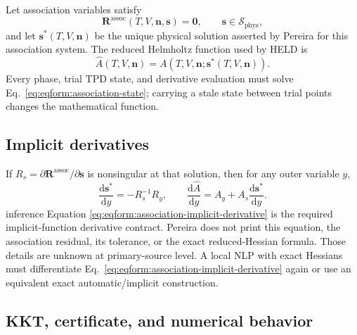 \documentclass[11pt]{article}
\newcommand{\Evidence}[1]{\textsf{#1}}
\newcommand{\dd}{\mathrm{d}}
\begin{document}
Let association variables satisfy
\begin{equation}
 \boldsymbol R^{\mathrm{assoc}}
 (T,V,\boldsymbol n,\boldsymbol s)=\boldsymbol0,\qquad
 \boldsymbol s\in\mathcal S_{\mathrm{phys}},
\label{eq:eqform:association-state}
\end{equation}
and let \(\boldsymbol s^*(T,V,\boldsymbol n)\) be the unique physical solution
asserted by Pereira for this association system.
The reduced Helmholtz function used by HELD is
\begin{equation}
 \widehat A(T,V,\boldsymbol n)=
 A(T,V,\boldsymbol n;\boldsymbol s^*(T,V,\boldsymbol n)).
\label{eq:eqform:association-reduced-helmholtz}
\end{equation}
Every phase, trial TPD state, and derivative evaluation must solve
Eq.~\eqref{eq:eqform:association-state}; carrying a stale state between trial
points changes the mathematical function.

\subsection{Implicit derivatives}

If \(R_s=\partial\boldsymbol R^{\mathrm{assoc}}/\partial\boldsymbol s\)
is nonsingular at that solution, then for any outer variable \(y\),
\begin{equation}
 \frac{\dd\boldsymbol s^*}{\dd y}
 =-R_s^{-1}R_y,\qquad
 \frac{\dd\widehat A}{\dd y}
 =A_y+A_s\frac{\dd\boldsymbol s^*}{\dd y}.
\label{eq:eqform:association-implicit-derivative}
\end{equation}
\Evidence{inference} Equation
\eqref{eq:eqform:association-implicit-derivative} is the required
implicit-function derivative contract. Pereira does not print this equation,
the association residual, its tolerance, or the exact reduced-Hessian formula.
Those details are \Evidence{unknown} at primary-source level. A local NLP with
exact Hessians must differentiate
Eq.~\eqref{eq:eqform:association-implicit-derivative} again or use an
equivalent exact automatic/implicit construction.

\subsection{KKT, certificate, and numerical behavior}
\end{document}
